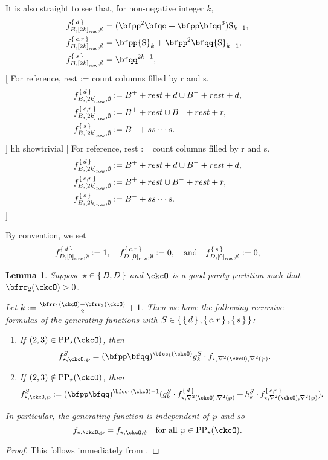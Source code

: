 \documentclass[12pt,a4paper]{amsart}
\newcommand{\trivial}[2][]{\if\relax\detokenize{#1}\relax
  {%
      \color{orange} \vspace{0em} $[$  #2 $]$
      \color{black}
  }
  \else
\ifx#1h
\ifcsname showtrivial\endcsname
{%
    \color{orange} \vspace{0em}  $[$ #2 $]$
    \color{black}
}
\fi
\else {\red Wrong argument!} \fi
\fi
}
\newcommand{\RS}{{\mathrm {S}}}
\def\DD{\nabla}
\numberwithin{equation}{section}
\newtheorem{lem}[thm]{Lemma}
\theoremstyle{remark}
\def\DD{\nabla}
\def\AND{\quad \text{and} \quad}
\def\CPPs{\mathrm{PP}_{\star}}
\def\yrow#1{\left[#1\right]_{\mathrm{row}}}
\begin{document}
It is also straight to see that, for non-negative  integer $k$,
\[
  \begin{split}
   f_{B,\yrow{2k},\emptyset}^{\set{d}} & = (\bfpp^{2}\bfqq+ \bfpp\bfqq^{3})\RS_{k-1}, \\
   f_{B,\yrow{2k},\emptyset}^{\set{c,r}} & = \bfpp\RS_{k} + \bfpp^{2}\bfqq\RS_{k-1},  \\
  f_{B,\yrow{2k},\emptyset}^{\set{s}} & = \bfqq^{2k+1},\\
  \end{split}
\]
\trivial[h]{
  For reference, rest := count columns filled by r and s.
\[
  \begin{split}
    f_{B,\yrow{2k},\emptyset}^{\set{d}} &:=  B^{+} + rest + d \cup B^{-}+rest+d, \\
    f_{B,\yrow{2k},\emptyset}^{\set{c,r}}   &:= B^{+} + rest \cup B^{-}+rest+r, \\
    f_{B,\yrow{2k},\emptyset}^{\set{s}} & := B^{-} + ss\cdots s.\\
  \end{split}
\]
}

By convention, we set
\[
  f_{D,\yrow{0}, \emptyset}^{\set{d}} := 1, \quad
  f_{D,\yrow{0}, \emptyset}^{\set{c,r}} := 0,
  \AND
  f_{D,\yrow{0}, \emptyset}^{\set{s}} := 0,
\]

\begin{lem}\label{lem:gf.BD}
  Suppose $\star\in\set{B,D}$ and $\ckcO$ is a good parity partition such that $\bfrr_{2}(\ckcO)>0$.

  Let $k:=\frac{\bfrr_{1}(\ckcO)-\bfrr_{2}(\ckcO)}{2}+1$.
  Then we have the following  recursive formulas of the generating functions
  with $S \in \set{\set{d}, \set{c,r}, \set{s}}$:
  \begin{enumerate}[label=(\alph*)]
    \item If $(2,3)\in \CPPs(\ckcO)$, then
    \[
      f_{\star,\ckcO, \wp}^{S} = (\bfpp\bfqq)^{\bfcc_{1}(\ckcO)} \TSk{k}{S} \cdot  f_{\star,\DD^{2}(\ckcO),\DD^{2}(\wp)}.
    \]
    \item If $(2,3)\notin \CPPs(\ckcO)$,
    then
    \[
      f_{\star,\ckcO, \wp}^{S} := (\bfpp\bfqq)^{\bfcc_{1}(\ckcO)-1} (\TSk{k}{S} \cdot f_{\star,\DD^{2}(\ckcO),\DD^{2}(\wp)}^{\set{d}}
      + \CSk{k}{S} \cdot f_{\star,\DD^{2}(\ckcO),\DD^{2}(\wp)}^{\set{c,r}}).
    \]
  \end{enumerate}
  In particular, the generating function is independent of $\wp$ and so
  \[
    f_{\star,\ckcO,\wp} = f_{\star,\ckcO,\emptyset} \quad \text{for all $\wp\in \CPPs(\ckcO)$.}
  \]
\end{lem}
\begin{proof}
  This follows immediately from .
\end{proof}
\end{document}

